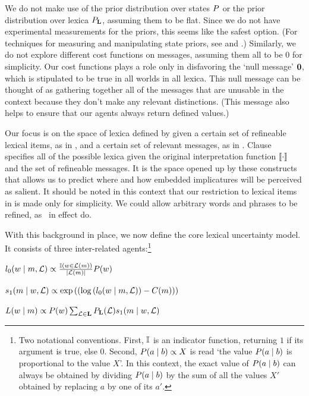 \documentclass[leqno]{article}
\begin{document}
We do not make use of the prior distribution over states $P$
or the prior distribution over lexica $P_{\mathbf{L}}$, assuming them to be
flat. Since we do not have experimental measurements for the priors,
this seems like the safest option. (For techniques for measuring and
manipulating state priors, see \citealt{Frank:Goodman:2012} and
\citealt{Stiller:Goodman:Frank:2011}.)  Similarly, we do not explore
different cost functions on messages, assuming them all to be $0$ for
simplicity. Our cost functions plays a role only in disfavoring the
`null message' $\mathbf{0}$, which is stipulated to be true in all
worlds in all lexica. This null message can be thought of as gathering
together all of the messages that are unusable in the context because
they don't make any relevant distinctions. (This message also helps to
ensure that our agents always return defined values.)

Our focus is on the space of lexica defined by
 given a certain set of refineable lexical
items, as in , and a certain set of
relevant messages, as in
. Clause~
specifies all of the possible lexica given the original interpretation
function $\llbracket\cdot\rrbracket$ and the set of refineable messages. It is the
space opened up by these constructs that allows us to predict where
and how embedded implicatures will be perceived as salient. It should
be noted in this context that our restriction to lexical items in
 is made only for simplicity. We could
allow arbitrary words and phrases to be refined, as \CFS\ in effect
do.

With this background in place, we now define the core lexical
uncertainty model. It consists of three inter-related
agents:\footnote{Two notational conventions. First, $\mathbb{I}$ is an
  indicator function, returning $1$ if its argument is true, else
  $0$. Second, $P(a \mid b) \propto X$ is read `the value $P(a
  \mid b)$ is proportional to the value $X$'. In this context, the
  exact value of $P(a \mid b)$ can always be obtained by dividing
  $P(a \mid b)$ by the sum of all the values $X'$ obtained by
  replacing $a$ by one of its $a'$.}
%
\begin{examples}
\item\label{agents}
  \begin{examples}
  \item\label{l0}%
    $l_{0}(w \mid m, \mathcal{L}) \propto
    \frac{\mathbb{I}(w \in \mathcal{L}(m))}{|\mathcal{L}(m)|}
    P(w)$

  \item\label{s1}%
    $s_{1}(m \mid w, \mathcal{L}) \propto
    \exp
    \left(
      \left(
        \log\left(l_{0}(w \mid m, \mathcal{L}) \right)
        - 
        C(m)
      \right)
    \right)$
    
  \item\label{L} 
    $L(w \mid m) 
    \propto 
    P(w)
    \sum_{\mathcal{L} \in \mathbf{L}}
    P_{\mathbf{L}}(\mathcal{L})
    s_{1}(m \mid w, \mathcal{L})$
  \end{examples}
\end{examples}
\end{document}
